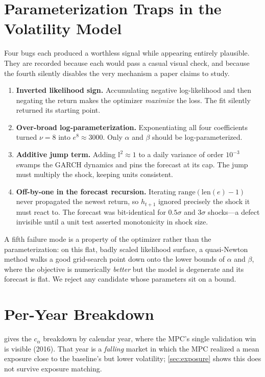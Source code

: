 \documentclass[journal]{IEEEtran}
\newcommand{\ind}{\mathbb{I}}
\begin{document}
\section{Parameterization Traps in the Volatility Model}
\label{app:traps}

Four bugs each produced a worthless signal while appearing entirely plausible.
They are recorded because each would pass a casual visual check, and because the
fourth silently disables the very mechanism a paper claims to study.

\begin{enumerate}
\item \textbf{Inverted likelihood sign.} Accumulating negative log-likelihood and
then negating the return makes the optimizer \emph{maximize} the loss. The fit
silently returned its starting point.
\item \textbf{Over-broad log-parameterization.} Exponentiating all four
coefficients turned $\nu=8$ into $e^8\approx 3000$. Only $\alpha$ and $\beta$
should be log-parameterized.
\item \textbf{Additive jump term.} Adding $\ind^2\approx 1$ to a daily variance of
order $10^{-3}$ swamps the GARCH dynamics and pins the forecast at its cap. The
jump must multiply the shock, keeping units consistent.
\item \textbf{Off-by-one in the forecast recursion.} Iterating
$\mathrm{range}(\mathrm{len}(e)-1)$ never propagated the newest return, so
$h_{t+1}$ ignored precisely the shock it must react to. The forecast was
bit-identical for $0.5\sigma$ and $3\sigma$ shocks---a defect invisible until a
unit test asserted monotonicity in shock size.
\end{enumerate}

A fifth failure mode is a property of the optimizer rather than the
parameterization: on this flat, badly scaled likelihood surface, a quasi-Newton
method walks a good grid-search point down onto the lower bounds of $\alpha$ and
$\beta$, where the objective is numerically \emph{better} but the model is
degenerate and its forecast is flat. We reject any candidate whose parameters sit
on a bound.

\section{Per-Year Breakdown}
\label{app:years}

 gives the $c_\alpha$ breakdown by calendar year, where the
MPC's single validation win is visible (2016). That year is a \emph{falling}
market in which the MPC realized a mean exposure close to the baseline's but lower
volatility; \cref{sec:exposure} shows this does not survive exposure matching.
\end{document}
